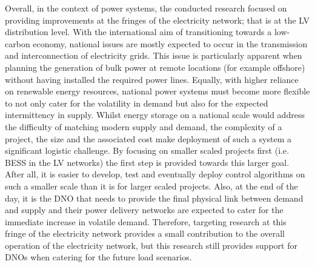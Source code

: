 Overall, in the context of power systems, the conducted research focused on providing improvements at the fringes of the electricity network; that is at the LV distribution level.
With the international aim of transitioning towards a low-carbon economy, national issues are mostly expected to occur in the transmission and interconnection of electricity grids.
This issue is particularly apparent when planning the generation of bulk power at remote locations (for example offshore) without having installed the required power lines.
Equally, with higher reliance on renewable energy resources, national power systems must become more flexible to not only cater for the volatility in demand but also for the expected intermittency in supply.
Whilst energy storage on a national scale would address the difficulty of matching modern supply and demand, the complexity of a project, the size and the associated cost make deployment of such a system a significant logistic challenge.
By focusing on smaller scaled projects first (i.e. BESS in the LV networks) the first step is provided towards this larger goal.
After all, it is easier to develop, test and eventually deploy control algorithms on such a smaller scale than it is for larger scaled projects.
Also, at the end of the day, it is the DNO that needs to provide the final physical link between demand and supply and their power delivery networks are expected to cater for the immediate increase in volatile demand.
Therefore, targeting research at this fringe of the electricity network provides a small contribution to the overall operation of the electricity network, but this research still provides support for DNOs when catering for the future load scenarios.
